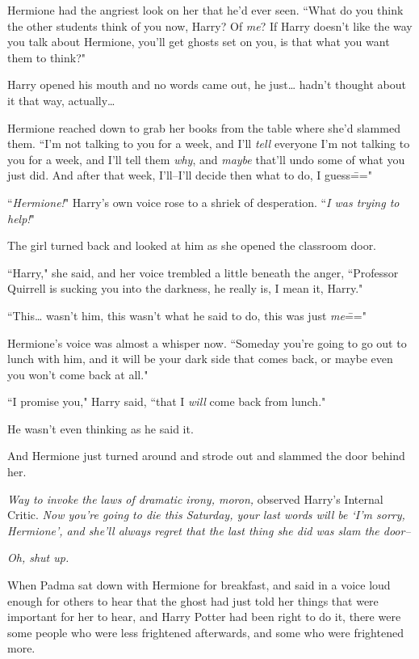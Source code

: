 Hermione had the angriest look on her that he'd ever seen. ``What do you think the other students think of you now, Harry? Of \emph{me}? If Harry doesn't like the way you talk about Hermione, you'll get ghosts set on you, is that what you want them to think?"

Harry opened his mouth and no words came out, he just{\ldots} hadn't thought about it that way, actually{\ldots}

Hermione reached down to grab her books from the table where she'd slammed them. ``I'm not talking to you for a week, and I'll \emph{tell} everyone I'm not talking to you for a week, and I'll tell them \emph{why}, and \emph{maybe} that'll undo some of what you just did. And after that week, I'll\---I'll decide then what to do, I guess\==="

``\emph{Hermione!}" Harry's own voice rose to a shriek of desperation. ``\emph{I was trying to help!}"

The girl turned back and looked at him as she opened the classroom door.

``Harry," she said, and her voice trembled a little beneath the anger, ``Professor Quirrell is sucking you into the darkness, he really is, I mean it, Harry."

``This{\ldots} wasn't him, this wasn't what he said to do, this was just \emph{me}\==="

Hermione's voice was almost a whisper now. ``Someday you're going to go out to lunch with him, and it will be your dark side that comes back, or maybe even you won't come back at all."

``I promise you," Harry said, ``that I \emph{will} come back from lunch."

He wasn't even thinking as he said it.

And Hermione just turned around and strode out and slammed the door behind her.

\emph{Way to invoke the laws of dramatic irony, moron,} observed Harry's Internal Critic. \emph{Now you're going to die this Saturday, your last words will be `I'm sorry, Hermione', and she'll always regret that the last thing she did was slam the door\---}

\emph{Oh, shut up.}

\later

When Padma sat down with Hermione for breakfast, and said in a voice loud enough for others to hear that the ghost had just told her things that were important for her to hear, and Harry Potter had been right to do it, there were some people who were less frightened afterwards, and some who were frightened more.

